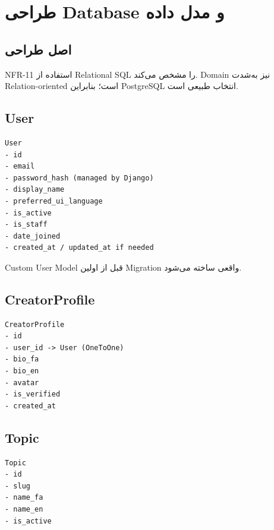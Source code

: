 
\chapter{طراحی Database و مدل داده}

\section{اصل طراحی}

NFR-11 استفاده از Relational SQL را مشخص می‌کند. Domain نیز به‌شدت Relation-oriented است؛ بنابراین PostgreSQL انتخاب طبیعی است.

\section{User}

\begin{latin}
\begin{lstlisting}
User
- id
- email
- password_hash (managed by Django)
- display_name
- preferred_ui_language
- is_active
- is_staff
- date_joined
- created_at / updated_at if needed
\end{lstlisting}
\end{latin}

\begin{decisionbox}
Custom User Model قبل از اولین Migration واقعی ساخته می‌شود.
\end{decisionbox}

\section{CreatorProfile}

\begin{latin}
\begin{lstlisting}
CreatorProfile
- id
- user_id -> User (OneToOne)
- bio_fa
- bio_en
- avatar
- is_verified
- created_at
\end{lstlisting}
\end{latin}

\section{Topic}

\begin{latin}
\begin{lstlisting}
Topic
- id
- slug
- name_fa
- name_en
- is_active
\end{lstlisting}
\end{latin}

